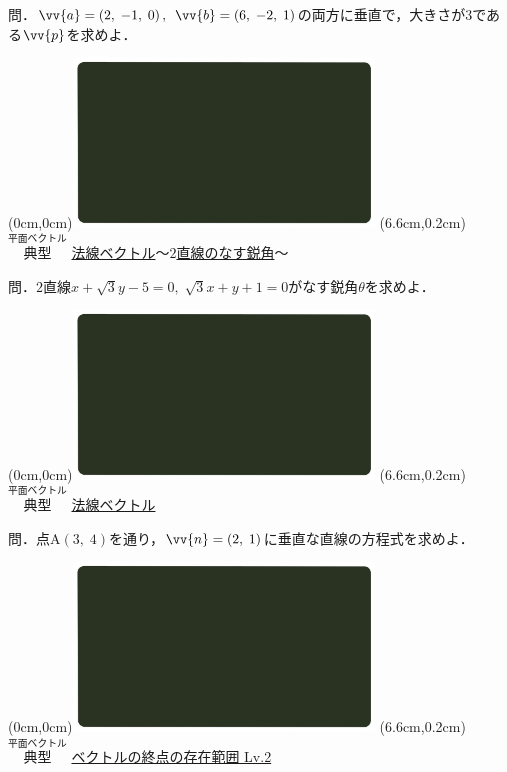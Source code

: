 \documentclass[10pt,
fleqn,
dvipdfmx,
uplatex
]{jsarticle}
\begin{document}
\Large 
問．$\vv{a}=\left(2,\;-1,\;0\right),\;$$\vv{b}=\left(6,\;-2,\;1\right)$の両方に垂直で，大きさが$3$である$\vv{p}$を求めよ．


\newpage



\at(0cm,0cm){\includegraphics[width=8cm,bb=0 0 1920 1080]{./youtube/thumbnails/templates/smart_background/平面ベクトル.jpeg}}
\at(6.6cm,0.2cm){\small\color{bradorange}$\overset{\text{平面ベクトル}}{\text{典型}}$}
{\color{orange}\large\underline{法線ベクトル$〜2$直線のなす鋭角$〜$}}\vspace{0.3zw}

\LARGE 
問．$2$直線$x+\sqrt 3y-5=0,\;\sqrt 3x+y+1=0$がなす鋭角$\theta$を求めよ．


\newpage



\at(0cm,0cm){\includegraphics[width=8cm,bb=0 0 1920 1080]{./youtube/thumbnails/templates/smart_background/平面ベクトル.jpeg}}
\at(6.6cm,0.2cm){\small\color{bradorange}$\overset{\text{平面ベクトル}}{\text{典型}}$}
{\color{orange}\huge\underline{法線ベクトル}}\vspace{0.3zw}

\LARGE 
問．点$\text{A}\left(3,\;4\right)$を通り，$\vv{n}=\left(2,\;1\right)$に垂直な直線の方程式を求めよ．


\newpage



\at(0cm,0cm){\includegraphics[width=8cm,bb=0 0 1920 1080]{./youtube/thumbnails/templates/smart_background/平面ベクトル.jpeg}}
\at(6.6cm,0.2cm){\small\color{bradorange}$\overset{\text{平面ベクトル}}{\text{典型}}$}
{\color{orange}\large\underline{ベクトルの終点の存在範囲 Lv.2 }}\vspace{0.3zw}
\end{document}
